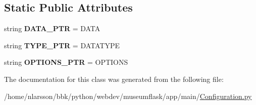 \subsection*{Static Public Attributes}
\begin{DoxyCompactItemize}
\item 
\mbox{\label{classConfiguration_1_1Configuration_a016c625b1fc16eda3d49d7fce938ca0d}} 
string {\bfseries D\+A\+T\+A\+\_\+\+P\+TR} = \textquotesingle{}D\+A\+TA\textquotesingle{}
\item 
\mbox{\label{classConfiguration_1_1Configuration_afc3aea02203e4b762029acced4364a32}} 
string {\bfseries T\+Y\+P\+E\+\_\+\+P\+TR} = \textquotesingle{}D\+A\+T\+A\+T\+Y\+PE\textquotesingle{}
\item 
\mbox{\label{classConfiguration_1_1Configuration_a0641b224096df98b8d097c18c1ea957a}} 
string {\bfseries O\+P\+T\+I\+O\+N\+S\+\_\+\+P\+TR} = \textquotesingle{}O\+P\+T\+I\+O\+NS\textquotesingle{}
\end{DoxyCompactItemize}


The documentation for this class was generated from the following file\+:\begin{DoxyCompactItemize}
\item 
/home/nlarsson/bbk/python/webdev/museumflask/app/main/\mbox{\hyperlink{Configuration_8py}{Configuration.\+py}}\end{DoxyCompactItemize}
